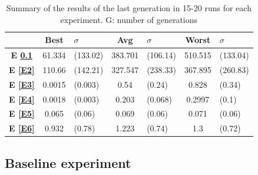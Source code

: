 \documentclass[sigconf]{acmart}
\newcommand{\myfloatalign}{\centering} %
\begin{document}
\begin{table}
	\myfloatalign
	\begin{tabular}{cclclcl}
		& \textbf{Best}& $\sigma$  &\textbf{Avg}&$\sigma$  & 
		\textbf{Worst}&$\sigma$ \\ \hline
		\textbf{E \ref{E1}}&61.334&(133.02)&383.701&(106.14)&510.515&(133.04)\\  \hline
		\textbf{E \ref{E2}}&110.66&(142.21)&327.547&(238.33)&367.895&(260.83)  \\  
		\hline
		\textbf{E \ref{E3}}&0.0015&(0.003)&0.54&(0.24)&0.828&(0.34)   \\  \hline
		\textbf{E \ref{E4}}&0.0018&(0.003)&0.203&(0.068)&0.2997&(0.1)  \\  \hline
		\textbf{E \ref{E5}}& 0.065&(0.06)&0.069&(0.06)&0.071&(0.06)     \\  \hline 
		\textbf{E \ref{E6}}& 0.932&(0.78)&1.223&(0.74)&1.3&(0.72) \\  \hline
		\hline
	\end{tabular}
	\caption{Summary of the results of the last generation in 15-20 runs for 
	each
		experiment.
		G: number of generations} %
	\label{t:resOver2}
\end{table}

\subsection{Baseline experiment}\label{E1}
\end{document}

